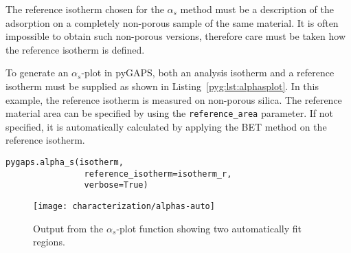 The reference isotherm chosen for the \(\alpha_s\) method must be a description
of the adsorption on a completely non-porous sample of the same material. It is
often impossible to obtain such non-porous versions, therefore care must be 
taken how the reference isotherm is defined.

To generate an \(\alpha_s\)-plot in pyGAPS, both an analysis isotherm
and a reference isotherm must be supplied as shown in Listing~\ref{pyg:lst:alphasplot}. 
In this example, the reference isotherm is measured on non-porous silica.
The reference material area can be specified by using the \lstinline{reference_area}
parameter. If not specified, it is automatically calculated by applying the BET 
method on the reference isotherm.

\begin{lstlisting}[caption={Generating an \(\alpha_s\)-plot},label={pyg:lst:alphasplot}]
pygaps.alpha_s(isotherm, 
				reference_isotherm=isotherm_r,
				verbose=True)
\end{lstlisting}

\begin{figure}[h!]
	\centering

	\texttt{[image: characterization/alphas-auto]}
	\caption{Output from the \(\alpha_s\)-plot function showing two
	automatically fit regions.}%
    \label{pyg:fgr:alphasplot}

\end{figure}
